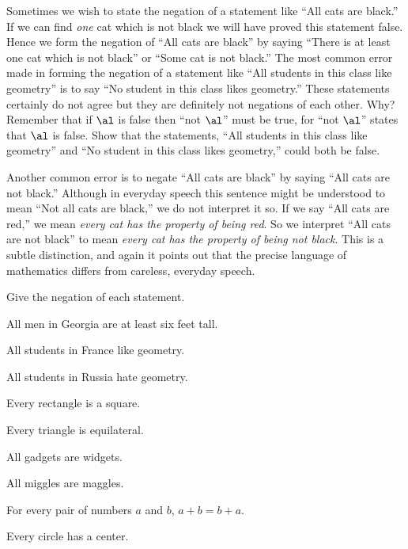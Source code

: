 \documentclass[11pt]{book}
\theoremstyle{bkplain}
\theoremstyle{XIplainnote}
\theoremstyle{bkplain}
\theoremstyle{bkplain}
\begin{document}
Sometimes we wish to state the negation of a statement like ``All cats are
black.'' If we can find \emph{one} cat which is not black we will have proved
this statement false. Hence we form the negation of ``All cats are black'' by
saying ``There is at least one cat which is not black'' or ``Some cat is not
black.'' The most common error made in forming the negation of a
statement like ``All students in this class like geometry'' is to say ``No
student in this class likes geometry.'' These statements certainly do not agree
but they are definitely not negations of each other. Why? Remember that if $\al$
is false then ``not $\al$'' must be true, for ``not $\al$'' states that $\al$ is
false. Show that the statements, ``All students in this class like geometry'' and
``No student in this class likes geometry,'' could both be false.

Another common error is to negate ``All cats are black'' by saying ``All cats are
not black.'' Although in everyday speech this sentence might be understood to
mean ``Not all cats are black,'' we do not interpret it so. If we say ``All cats
are red,'' we mean \emph{every cat has the property of being red}. So we interpret
``All cats are not black'' to mean \emph{every cat has the property of being not
black}. This is a subtle distinction, and again it points out that the precise
language of mathematics differs from careless, everyday speech.


Give the negation of each statement.

\begin{exercisecols}
\begin{exlist}
\item All men in Georgia are at least six feet tall.
\item All students in France like geometry.
\item All students in Russia hate geometry.
\item Every rectangle is a square.
\item Every triangle is equilateral.
\item All gadgets are widgets.
\item All miggles are maggles.
\item[\stex 8.] For every pair of numbers $a$ and $b$, $a + b = b + a$.
\item[9.] Every circle has a center.
\end{exlist}
\end{exercisecols}
\end{document}
